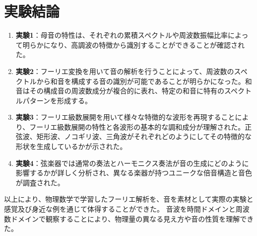 \documentclass{article}
\begin{document}
\section{実験結論}
\begin{enumerate}[label=\arabic*), before=\begin{spacing}{1.2}, after=\end{spacing}] %
    \item \textbf{実験1}：母音の特性は、それぞれの累積スペクトルや周波数振幅比率によって明らかになり、高調波の特徴から識別することができることが確認された。
    \item \textbf{実験2}：フーリエ変換を用いて音の解析を行うことによって、周波数のスペクトルから和音を構成する音の識別が可能であることが明らかになった。和音はその構成音の周波数成分が複合的に表れ、特定の和音に特有のスペクトルパターンを形成する。
    \item \textbf{実験3}：フーリエ級数展開を用いて様々な特徴的な波形を再現することにより、フーリエ級数展開の特性と各波形の基本的な調和成分が理解された。正弦波、矩形波、ノコギリ波、三角波がそれぞれどのようにしてその特徴的な形状を生成しているかが示された。
    \item \textbf{実験4}：弦楽器では通常の奏法とハーモニクス奏法が音の生成にどのように影響するかが詳しく分析され、異なる楽器が持つユニークな倍音構造と音色が調査された。
\end{enumerate}
\begin{spacing}{1.2}
    以上により、物理数学で学習したフーリエ解析を、音を素材として実際の実験と感覚及び身近な例を通じて体得することができた。
    音波を時間ドメインと周波数ドメインで観察することにより、物理量の異なる見え方や音の性質を理解できた。
\end{spacing}

\newpage
\end{document}
